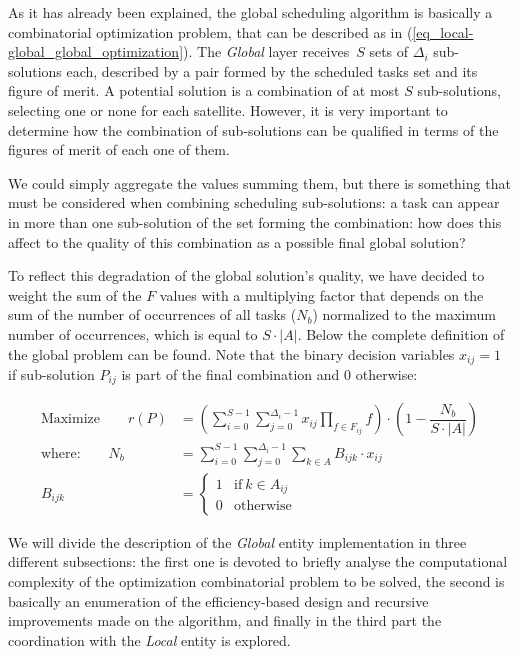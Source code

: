 As it has already been explained, the global scheduling algorithm is basically a combinatorial optimization problem, that can be described as in (\ref{eq_local-global_global_optimization}). The \emph{Global} layer receives\ $S$ sets of $\Delta_i$ sub-solutions each, described by a pair formed by the scheduled tasks set and its figure of merit. A potential solution is a combination of at most $S$ sub-solutions, selecting one or none for each satellite. However, it is very important to determine how the combination of sub-solutions can be qualified in terms of the figures of merit of each one of them.

We could simply aggregate the values summing them, but there is something that must be considered when combining scheduling sub-solutions: a task can appear in more than one sub-solution of the set forming the combination: how does this affect to the quality of this combination as a possible final global solution?

To reflect this degradation of the global solution's quality, we have decided to weight the sum of the $F$ values with a multiplying factor that depends on the sum of the number of occurrences of all tasks ($N_b$) normalized to the maximum number of occurrences, which is equal to $S\cdot |A|$. Below the complete definition of the global problem can be found. Note that the binary decision variables $x_{ij}=1$ if sub-solution $P_{ij}$ is part of the final combination and $0$ otherwise: 

\begin{subequations}
\label{eq_local-global_global_optimization}
\begin{align}
\text{Maximize} \qquad r(P) &= \left(\sum_{i=0}^{S-1}\sum_{j=0}^{\Delta_i-1}x_{ij}{\prod_{f \in F_{ij}}f}\right)\cdot\left(1-\dfrac{N_b}{S\cdot |A|}\right)\\
\text{where:} \qquad N_b &= \sum_{i=0}^{S-1}\sum_{j=0}^{\Delta_i-1}\sum_{k \in A}{B_{ijk}\cdot x_{ij}}\\
B_{ijk} &= \begin{cases}1 & \text{if} ~k \in A_{ij}\\ 0 & \text{otherwise}\end{cases}
\end{align}
\end{subequations}

We will divide the description of the \emph{Global} entity implementation in three different subsections: the first one is devoted to briefly analyse the computational complexity of the optimization combinatorial problem to be solved, the second is basically an enumeration of the efficiency-based design and recursive improvements made on the algorithm, and finally in the third part the coordination with the \emph{Local} entity is explored. 


